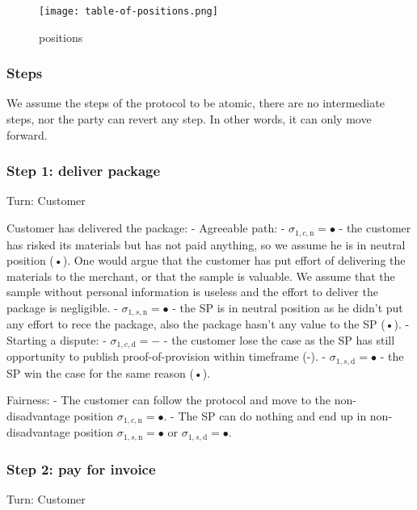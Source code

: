 \documentclass{article}
\begin{document}
\begin{figure}[h!]
    \centering
    \texttt{[image: table-of-positions.png]}
    \caption{positions}
    \label{fig:my_label}
\end{figure}

\subsubsection{Steps}
We assume the steps of the protocol to be atomic, there are no intermediate steps, nor the party can revert any step. In other words, it can only move forward.

\subsubsection{Step 1: deliver package}
Turn: Customer 

Customer has delivered the package:
- Agreeable path:
	- $\sigma_{1, c, \mathrm{n}} = •$ - the customer has risked its materials but has not paid anything, so we assume he is in neutral position (•). One would argue that the customer has put effort of delivering the materials to the merchant, or that the sample is valuable. We assume that the sample without personal information is useless and the effort to deliver the package is negligible.
	- $\sigma_{1, s, \mathrm{n}} = •$ - the SP is in neutral position as he didn't put any effort to rece the package, also the package hasn't any value to the SP (•).
- Starting a dispute:
	- $\sigma_{1, c, \mathrm{d}} = -$ - the customer lose the case as the SP has still opportunity to publish proof-of-provision within timeframe (-).
	- $\sigma_{1, s, \mathrm{d}} = •$ - the SP win the case for the same reason (•).

Fairness:
- The customer can follow the protocol and move to the non-disadvantage position $\sigma_{1, c, \mathrm{n}} = •$.
- The SP can do nothing and end up in non-disadvantage position $\sigma_{1, s, \mathrm{n}} = •$ or $\sigma_{1, s, \mathrm{d}} = •$.

\subsubsection{Step 2: pay for invoice}
Turn: Customer
\end{document}
